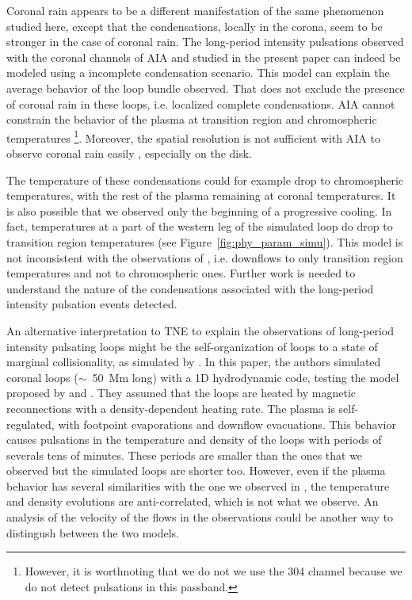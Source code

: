 \documentclass[preprint2]{aastex6}
\begin{document}
\medskip

Coronal rain appears to be a different manifestation of the same phenomenon studied here, except that the condensations, locally in the corona, seem to be stronger in the case of coronal rain. 
The long-period intensity pulsations observed with the coronal channels of AIA and studied in the present paper can indeed be modeled using a incomplete condensation scenario. This model can explain the average behavior of the loop bundle observed. That does not exclude the presence of coronal rain in these loops, i.e. localized complete condensations. AIA cannot constrain the behavior of the plasma at transition region and chromospheric temperatures \footnote{However, it is worthnoting that we do not we use the 304 channel because we do not detect pulsations in this passband.}. Moreover, the spatial resolution is not sufficient with AIA to observe coronal rain easily \citep{antolin2015}, especially on the disk.

The temperature of these condensations could for example drop to chromospheric temperatures, with the rest of the plasma remaining at coronal temperatures. It is also possible that we observed only the beginning of a progressive cooling. In fact, temperatures at a part of the western leg of the simulated loop do drop to transition region temperatures (see Figure~\ref{fig:phy_param_simu}). This model is not inconsistent with the observations of \citet{straus_steady-state_2015}, i.e. downflows to only transition region temperatures and not to chromospheric ones. Further work is needed to understand the nature of the condensations associated with the long-period intensity pulsation events detected.

\medskip
	
An alternative interpretation to TNE to explain the observations of long-period intensity pulsating loops might be the self-organization of loops to a state of marginal collisionality, as simulated by \citet{imada2012}. In this paper, the authors simulated coronal loops ($\sim$~50~Mm long) with a 1D hydrodynamic code, testing the model proposed by \citet{uzdensky2007} and \citet{cassak2008}. They assumed that the loops are heated by magnetic reconnections with a density-dependent heating rate. The plasma is self-regulated, with footpoint evaporations and downflow evacuations. This behavior causes pulsations in the temperature and density of the loops with periods of severals tens of minutes.
These periods are smaller than the ones that we observed but the simulated loops are shorter too. However, even if the plasma behavior has several similarities with the one we observed in \citet{froment2015}, the temperature and density evolutions are anti-correlated, which is not what we observe.
An analysis of the velocity of the flows in the observations could be another way to distingush between the two models.
\end{document}
